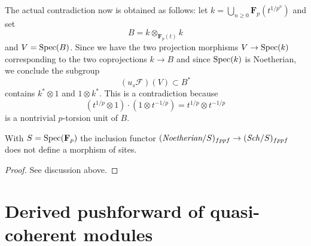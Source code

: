 \medskip\noindent
The actual contradiction now is obtained as follows:
let $k = \bigcup_{n \geq 0} \mathbf{F}_p(t^{1/{p^n}})$
and set
$$
B = k \otimes_{\mathbf{F}_p(t)} k
$$
and $V = \mathop{\mathrm{Spec}}(B)$. Since we have the two projection morphisms
$V \to \mathop{\mathrm{Spec}}(k)$ corresponding to the two coprojections $k \to B$
and since $\mathop{\mathrm{Spec}}(k)$ is Noetherian, we conclude the subgroup
$$
(u_s\mathcal{F})(V) \subset B^*
$$
contains $k^* \otimes 1$ and $1 \otimes k^*$. This is a contradiction
because
$$
(t^{1/p} \otimes 1) \cdot (1 \otimes t^{-1/p}) =
t^{1/p} \otimes t^{-1/p}
$$
is a nontrivial $p$-torsion unit of $B$.

\begin{lemma}
\label{lemma-not-a-morphism-of-sites-noetherian-to-all}
With $S = \mathop{\mathrm{Spec}}(\mathbf{F}_p)$ the inclusion functor
$(\textit{Noetherian}/S)_{fppf} \to (\mathit{Sch}/S)_{fppf}$
does not define a morphism of sites.
\end{lemma}

\begin{proof}
See discussion above.
\end{proof}





\section{Derived pushforward of quasi-coherent modules}
\label{section-derived-push-quasi-coherent}


